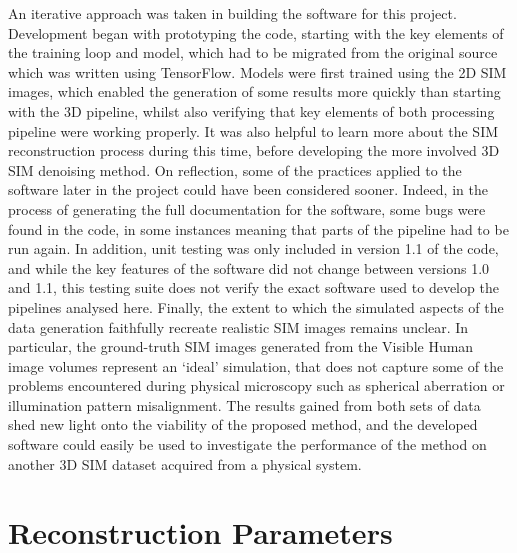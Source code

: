 \documentclass[12pt]{article}
\begin{document}
An iterative approach was taken in building the software for this project.
Development began with prototyping the code, starting with the key elements of the training loop and model,
which had to be migrated from the original source which was written using TensorFlow.
Models were first trained using the 2D SIM images,
which enabled the generation of some results more quickly than starting with the 3D pipeline,
whilst also verifying that key elements of both processing pipeline were working properly.
It was also helpful to learn more about the SIM reconstruction process during this time,
before developing the more involved 3D SIM denoising method.
On reflection, some of the practices applied to the software later in the project could have been considered sooner.
Indeed, in the process of generating the full documentation for the software,
some bugs were found in the code, in some instances meaning that parts of the pipeline had to be run again.
In addition, unit testing was only included in version 1.1 of the code,
and while the key features of the software did not change between versions 1.0 and 1.1,
this testing suite does not verify the exact software used to develop the pipelines analysed here.
Finally, the extent to which the simulated aspects of the data generation faithfully recreate realistic SIM images remains unclear.
In particular, the ground-truth SIM images generated from the Visible Human image volumes represent an `ideal' simulation,
that does not capture some of the problems encountered during physical microscopy such as spherical aberration or illumination pattern misalignment.
The results gained from both sets of data shed new light onto the viability of the proposed method,
and the developed software could easily be used to investigate the performance of the method on another 3D SIM dataset acquired from a physical system.

\newpage




\newpage

\appendix

\section{Reconstruction Parameters}
\end{document}
